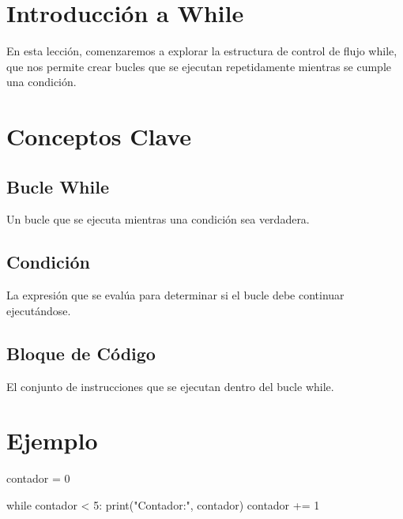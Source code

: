 \documentclass[
  a4paper,
  DIV=11,
  numbers=noendperiod,
  onepage,
  openany]{scrreprt}
\newenvironment{Shaded}{\begin{snugshade}}{\end{snugshade}}
\newcommand{\BuiltInTok}[1]{\textcolor[rgb]{0.00,0.23,0.31}{#1}}
\newcommand{\ControlFlowTok}[1]{\textcolor[rgb]{0.00,0.23,0.31}{#1}}
\newcommand{\DecValTok}[1]{\textcolor[rgb]{0.68,0.00,0.00}{#1}}
\newcommand{\NormalTok}[1]{\textcolor[rgb]{0.00,0.23,0.31}{#1}}
\newcommand{\OperatorTok}[1]{\textcolor[rgb]{0.37,0.37,0.37}{#1}}
\newcommand{\StringTok}[1]{\textcolor[rgb]{0.13,0.47,0.30}{#1}}
\begin{document}
\section{Introducción a While}\label{introducciuxf3n-a-while}

En esta lección, comenzaremos a explorar la estructura de control de
flujo while, que nos permite crear bucles que se ejecutan repetidamente
mientras se cumple una condición.

\section{Conceptos Clave}\label{conceptos-clave-16}

\subsection{Bucle While}\label{bucle-while}

Un bucle que se ejecuta mientras una condición sea verdadera.

\subsection{Condición}\label{condiciuxf3n}

La expresión que se evalúa para determinar si el bucle debe continuar
ejecutándose.

\subsection{Bloque de Código}\label{bloque-de-cuxf3digo-1}

El conjunto de instrucciones que se ejecutan dentro del bucle while.

\section{Ejemplo}\label{ejemplo-11}

\begin{Shaded}
\begin{Highlighting}[]
\NormalTok{contador }\OperatorTok{=} \DecValTok{0}

\ControlFlowTok{while}\NormalTok{ contador }\OperatorTok{\textless{}} \DecValTok{5}\NormalTok{:}
    \BuiltInTok{print}\NormalTok{(}\StringTok{"Contador:"}\NormalTok{, contador)}
\NormalTok{    contador }\OperatorTok{+=} \DecValTok{1}
\end{Highlighting}
\end{Shaded}
\end{document}
